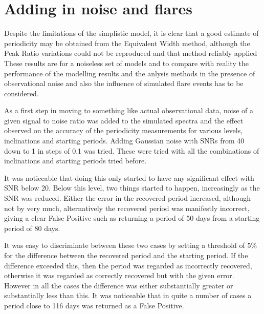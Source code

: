 \section{Adding in noise and flares}
\protect\label{section:addflares}

Despite the limitations of the simplistic model, it is clear that a good estimate of periodicity may be obtained from
the Equivalent Width method, although the Peak Ratio variations could not be reproduced and that method reliably applied
These results are for a noiseless set of models and to compare with reality the performance of the modelling results and
the anlysis methods in the presence of observational noise and also the influence of simulated flare events has to be
considered.

As a first step in moving to something like actual observational data, noise of a given signal to noise ratio was added
to the simulated spectra and the effect observed on the accuracy of the periodicity measurements for various levels,
inclinations and starting periods. Adding Gaussian noise with SNRs from 40 down to 1 in steps of 0.1 was tried.
These were tried with all the combinations of inclinations and starting periods tried before.

It was noticeable that doing this only started to have any significant effect with SNR below 20. Below this level, two
things started to happen, increasingly as the SNR was reduced. Either the error in the recovered period increased,
although not by very much, alternatively the recovered period was manifestly incorrect, giving a clear False Positive
such as returning a period of 50 days from a starting period of 80 days.

It was easy to discriminate between these two cases by setting a threshold of 5\% for the difference between the
recovered period and the starting period. If the difference exceeded this, then the period was regarded as incorrectly
recovered, otherwise it was regarded as correctly recovered but with the given error. However in all the cases the
difference was either substantially greater or substantially less than this. It was noticeable that in quite a number of
cases a period close to 116 days was returned as a False Positive.

